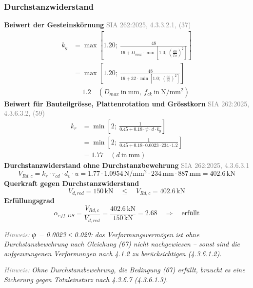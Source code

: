 \documentclass[11pt,a4paper]{article}
\newcommand{\normref}[1]{{\small\textcolor{gray}{#1}}}
\newcommand{\hinweis}[2]{\par\noindent\textcolor{gray}{\textit{#1:}} \textit{#2}\par}
\begin{document}
\subsubsection{Durchstanzwiderstand}
\noindent\textbf{Beiwert der Gesteinskörnung} \hfill \normref{SIA 262:2025, 4.3.3.2.1, (37)}
\begin{equation*}
\begin{aligned}
  k_g &= \max\left[1.20;\ \frac{48}{16 + D_{max} \cdot \min\left[1.0;\ \left(\frac{60}{f_{ck}}\right)^{2}\right]}\right] \\
  &= \max\left[1.20;\ \frac{48}{16 + 32 \cdot \min\left[1.0;\ \left(\frac{60}{30}\right)^{2}\right]}\right] \\
  &= 1.2 \quad \left(D_{max}\ \text{in}\ \mathrm{mm},\ f_{ck}\ \text{in}\ \mathrm{N}/\mathrm{mm}^{2}\right)
\end{aligned}
\end{equation*}
\noindent\textbf{Beiwert für Bauteilgrösse, Plattenrotation und Grösstkorn} \hfill \normref{SIA 262:2025, 4.3.6.3.2, (59)}
\begin{equation*}
\begin{aligned}
  k_r &= \min\left[2;\ \frac{1}{0.45 + 0.18 \cdot \psi \cdot d \cdot k_g}\right] \\
  &= \min\left[2;\ \frac{1}{0.45 + 0.18 \cdot 0.0023 \cdot 234 \cdot 1.2}\right] \\
  &= 1.77 \quad \left(d\ \text{in}\ \mathrm{mm}\right)
\end{aligned}
\end{equation*}
\noindent\textbf{Durchstanzwiderstand ohne Durchstanzbewehrung} \hfill \normref{SIA 262:2025, 4.3.6.3.1}
\begin{equation*}
V_{Rd,c} = k_r \cdot \tau_{cd} \cdot d_v \cdot u = 1.77 \cdot 1.0954\,\mathrm{N}/\mathrm{mm}^{2} \cdot 234\,\mathrm{mm} \cdot 887\,\mathrm{mm} = 402.6\,\mathrm{kN}
\end{equation*}
\noindent\textbf{Querkraft gegen Durchstanzwiderstand}
\begin{equation*}
V_{d,red} = 150\,\mathrm{kN} \quad \le \quad V_{Rd,c} = 402.6\,\mathrm{kN}
\end{equation*}
\noindent\textbf{Erfüllungsgrad}
\begin{equation*}
\alpha_{eff,DS} = \frac{V_{Rd,c}}{V_{d,red}} = \frac{402.6\,\mathrm{kN}}{150\,\mathrm{kN}} = 2.68 \quad \Rightarrow \quad \text{erfüllt}
\end{equation*}
\hinweis{Hinweis}{ψ = 0.0023 ≤ 0.020: das Verformungsvermögen ist ohne Durchstanzbewehrung nach Gleichung (67) nicht nachgewiesen -- sonst sind die aufgezwungenen Verformungen nach 4.1.2 zu berücksichtigen (4.3.6.1.2).}
\hinweis{Hinweis}{Ohne Durchstanzbewehrung, die Bedingung (67) erfüllt, braucht es eine Sicherung gegen Totaleinsturz nach 4.3.6.7 (4.3.6.1.3).}
\end{document}
